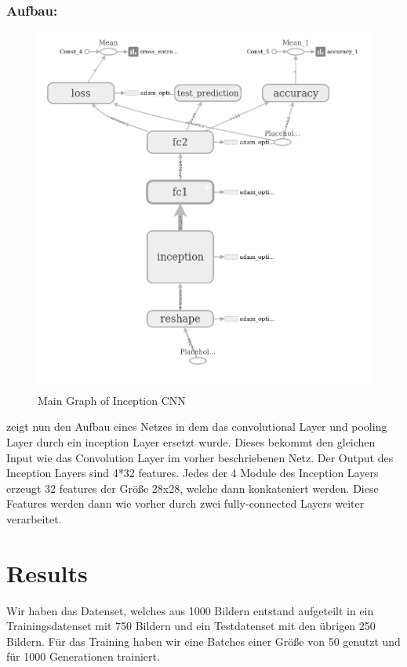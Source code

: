 \documentclass[runningheads,a4paper]{llncs}[2015/06/24]
\begin{document}
\subsubsection*{Aufbau:}
\begin{figure}
	\includegraphics[width=\textwidth]{images/main_graph_inception.png}
	\caption{Main Graph of Inception CNN}
	\label{fig:main_graph_inception}
\end{figure}
 zeigt nun den Aufbau eines Netzes in dem das convolutional Layer und pooling Layer durch ein inception Layer ersetzt wurde. Dieses bekommt den gleichen Input wie das Convolution Layer im vorher beschriebenen Netz. Der Output des Inception Layers sind 4*32 features. Jedes der 4 Module des Inception Layers erzeugt 32 features der Größe 28x28, welche dann konkateniert werden. Diese Features werden dann wie vorher durch zwei fully-connected Layers weiter verarbeitet.

\section{Results}\label{sec:result}
Wir haben das Datenset, welches aus 1000 Bildern entstand aufgeteilt in ein Trainingsdatenset mit 750 Bildern und ein Testdatenset mit den übrigen 250 Bildern. Für das Training haben wir eine Batches einer Größe von 50 genutzt und für 1000 Generationen trainiert. \\
\end{document}
